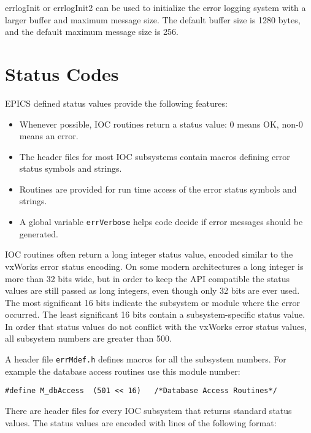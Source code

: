 errlogInit or errlogInit2 can be used to initialize the error logging system with a larger buffer and maximum message size. 
The default buffer size is 1280 bytes, and the default maximum message size is 256.

\section{Status Codes}

EPICS defined status values provide the following features:

\begin{itemize}
\item Whenever possible, IOC routines return a status value: 0 means OK, non-0 means an error.

\item The header files for most IOC subsystems contain macros defining error status symbols and strings.

\item Routines are provided for run time access of the error status symbols and strings.

\item A global variable \verb|errVerbose| helps code decide if error messages should be generated.

\end{itemize}

IOC routines often return a long integer status value, encoded similar to the vxWorks error status encoding.
On some modern architectures a long integer is more than 32 bits wide, but in order to keep the API compatible the status values are still passed as long integers, even though only 32 bits are ever used.
The most significant 16 bits indicate the subsystem or module where the error occurred.
The least significant 16 bits contain a subsystem-specific status value.
In order that status values do not conflict with the vxWorks error status values, all subsystem numbers are greater than 500.

A header file \verb|errMdef.h| defines macros for all the subsystem numbers.
For example the database access routines use this module number:

\begin{verbatim}
#define M_dbAccess  (501 << 16)   /*Database Access Routines*/
\end{verbatim}

There are header files for every IOC subsystem that returns standard status 
values.
The status values are encoded with lines of the following format: 

